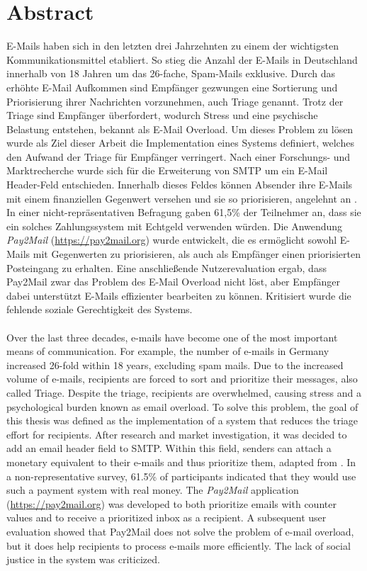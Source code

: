 
\chapter*{Abstract}
E-Mails haben sich in den letzten drei Jahrzehnten zu einem der wichtigsten Kommunikationsmittel etabliert. So stieg die Anzahl der E-Mails in Deutschland innerhalb von 18 Jahren um das 26-fache, Spam-Mails exklusive. Durch das erhöhte E-Mail Aufkommen sind Empfänger gezwungen eine Sortierung und Priorisierung ihrer Nachrichten vorzunehmen, auch Triage genannt. Trotz der Triage sind Empfänger überfordert, wodurch Stress und eine psychische Belastung entstehen, bekannt als E-Mail Overload. Um dieses Problem zu lösen wurde als Ziel dieser Arbeit die Implementation eines Systems definiert, welches den Aufwand der Triage für Empfänger verringert. Nach einer Forschungs- und Marktrecherche wurde sich für die Erweiterung von SMTP um ein E-Mail Header-Feld entschieden. Innerhalb dieses Feldes können Absender ihre E-Mails mit einem finanziellen Gegenwert versehen und sie so priorisieren, angelehnt an \cite{Turner2003}. In einer nicht-repräsentativen Befragung gaben 61,5\% der Teilnehmer an, dass sie ein solches Zahlungssystem mit Echtgeld verwenden würden. Die Anwendung \textit{Pay2Mail} (\url{https://pay2mail.org}) wurde entwickelt, die es ermöglicht sowohl E-Mails mit Gegenwerten zu priorisieren, als auch als Empfänger einen priorisierten Posteingang zu erhalten. Eine anschließende Nutzerevaluation ergab, dass Pay2Mail zwar das Problem des E-Mail Overload nicht löst, aber Empfänger dabei unterstützt E-Mails effizienter bearbeiten zu können. Kritisiert wurde die fehlende soziale Gerechtigkeit des Systems.
\\ \\
Over the last three decades, e-mails have become one of the most important means of communication. For example, the number of e-mails in Germany increased 26-fold within 18 years, excluding spam mails. Due to the increased volume of e-mails, recipients are forced to sort and prioritize their messages, also called Triage. Despite the triage, recipients are overwhelmed, causing stress and a psychological burden known as email overload. To solve this problem, the goal of this thesis was defined as the implementation of a system that reduces the triage effort for recipients. After research and market investigation, it was decided to add an email header field to SMTP. Within this field, senders can attach a monetary equivalent to their e-mails and thus prioritize them, adapted from \cite{Turner2003}. In a non-representative survey, 61.5\% of participants indicated that they would use such a payment system with real money. The \textit{Pay2Mail} application (\url{https://pay2mail.org}) was developed to both prioritize emails with counter values and to receive a prioritized inbox as a recipient. A subsequent user evaluation showed that Pay2Mail does not solve the problem of e-mail overload, but it does help recipients to process e-mails more efficiently. The lack of social justice in the system was criticized.